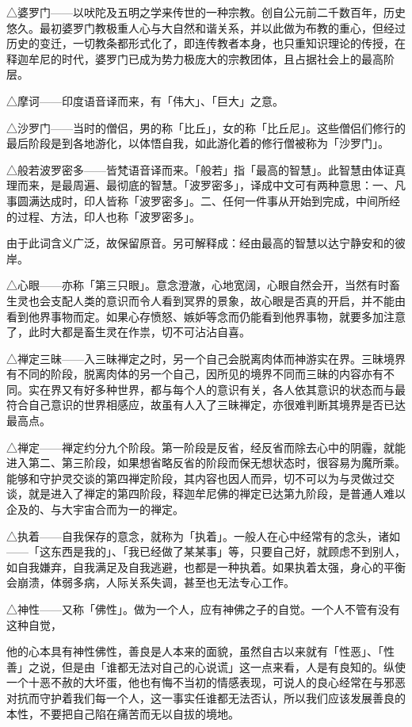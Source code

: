 \documentclass[12pt,twoside,openany]{book}
\begin{document}
△婆罗门——以吠陀及五明之学来传世的一种宗教。创自公元前二千数百年，历史悠久。最初婆罗门教极重人心与大自然和谐关系，并以此做为布教的重心，但经过历史的变迁，一切教条都形式化了，即连传教者本身，也只重知识理论的传授，在释迦牟尼的时代，婆罗门已成为势力极庞大的宗教团体，且占据社会上的最高阶层。

△摩诃——印度语音译而来，有「伟大」、「巨大」之意。

△沙罗门——当时的僧侣，男的称「比丘」，女的称「比丘尼」。这些僧侣们修行的最后阶段是到各地游化，以体悟自我，如此游化着的修行僧被称为「沙罗门」。

△般若波罗密多——皆梵语音译而来。「般若」指「最高的智慧」。此智慧由体证真理而来，是最周遍、最彻底的智慧。「波罗密多」，译成中文可有两种意思：一、凡事圆满达成时，印人皆称「波罗密多」。二、任何一件事从开始到完成，中间所经的过程、方法，印人也称「波罗密多」。

由于此词含义广泛，故保留原音。另可解释成：经由最高的智慧以达宁静安和的彼岸。

△心眼——亦称「第三只眼」。意念澄澈，心地宽阔，心眼自然会开，当然有时畜生灵也会支配人类的意识而令人看到冥界的景象，故心眼是否真的开启，并不能由看到他界事物而定。如果心存愤怒、嫉妒等念而仍能看到他界事物，就要多加注意了，此时大都是畜生灵在作祟，切不可沾沾自喜。

△禅定三昧——入三昧禅定之时，另一个自己会脱离肉体而神游实在界。三昧境界有不同的阶段，脱离肉体的另一个自己，因所见的境界不同而三昧的内容亦有不同。实在界又有好多种世界，都与每个人的意识有关，各人依其意识的状态而与最符合自己意识的世界相感应，故虽有人入了三昧禅定，亦很难判断其境界是否已达最高点。

△禅定——禅定约分九个阶段。第一阶段是反省，经反省而除去心中的阴霾，就能进入第二、第三阶段，如果想省略反省的阶段而保无想状态时，很容易为魔所乘。能够和守护灵交谈的第四禅定阶段，其内容也因人而异，切不可以为与灵做过交谈，就是进入了禅定的第四阶段，释迦牟尼佛的禅定已达第九阶段，是普通人难以企及的、与大宇宙合而为一的禅定。

△执着——自我保存的意念，就称为「执着」。一般人在心中经常有的念头，诸如——「这东西是我的」、「我已经做了某某事」等，只要自己好，就顾虑不到别人，如自我嫌弃，自我满足及自我逃避，也都是一种执着。如果执着太强，身心的平衡会崩溃，体弱多病，人际关系失调，甚至也无法专心工作。

△神性——又称「佛性」。做为一个人，应有神佛之子的自觉。一个人不管有没有这种自觉，

他的心本具有神性佛性，善良是人本来的面貌，虽然自古以来就有「性恶」、「性善」之说，但是由「谁都无法对自己的心说谎」这一点来看，人是有良知的。纵使一个十恶不赦的大坏蛋，他也有悔不当初的情感表现，可说人的良心经常在与邪恶对抗而守护着我们每一个人，这一事实任谁都无法否认，所以我们应该发展善良的本性，不要把自己陷在痛苦而无以自拔的境地。
\end{document}
